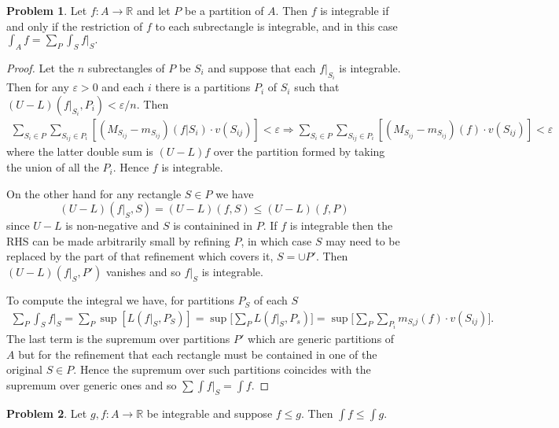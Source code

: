 \documentclass[20pt]{article}
\theoremstyle{plain}
\theoremstyle{definition}
\newtheorem*{problem}{Problem}
\newcommand{\reals}{\mathbb{R}}
\begin{document}
\begin{problem}{3.4}
  Let $f: A\to \reals$ and let $P$ be a partition of $A$. Then $f$ is integrable
  if and only if the restriction of $f$ to each subrectangle is integrable,
  and in this case $\int_A f = \sum_P \int_S f|_S.$
\end{problem}

\begin{proof}
  Let the $n$ subrectangles of $P$ be $S_i$ and suppose that each $f|_{S_i}$ is integrable.
  Then for any $\varepsilon > 0$ and each $i$ there is a partitions $P_i$ of $S_i$ such that
  $(U - L)(f|_{S_i}, P_i) <\varepsilon / n.$
  Then
  \begin{align*}
    \sum_{S_i \in P} \sum_{S_{ij} \in P_i} [ (M_{S_{ij}} - m_{S_{ij}})(f|S_i)\cdot v(S_{ij}) ] <
    \varepsilon \Longrightarrow
    \sum_{S_i \in P} \sum_{S_{ij} \in P_i} [ (M_{S_{ij}} - m_{S_{ij}})(f)\cdot v(S_{ij}) ] <
    \varepsilon
  \end{align*}
  where the latter double sum is $(U - L)f$ over the partition formed by taking the union of
  all the $P_i.$  Hence $f$ is integrable.

  On the other hand for any rectangle $S \in P$  we have
  $$(U-L)(f|_S, S) = (U-L)(f, S) \leq (U - L)(f, P)$$
  since $U-L$ is non-negative and $S$ is containined in $P$.
  If $f$ is integrable then the RHS can be made arbitrarily small by refining $P$,
  in which case $S$ may need to be replaced by the part of that refinement which
  covers it, $S = \cup P'$. Then $(U-L)(f|_S, P')$ vanishes and so $f|_S$
  is integrable.

  To compute the integral we have, for partitions $P_S$ of each $S$
  \begin{align*}
    \sum_P \int_{S} f|_S =
    \sum_P \sup [L(f|_S, P_S)] =
    \sup \bigg[\sum_P L(f|_S, P_s)\bigg] =
    \sup \bigg[\sum_P \sum_{P_i} m_{S_ij}(f)\cdot v(S_{ij}) \bigg].
  \end{align*}
  The last term is the supremum over partitions $P'$ which are generic partitions
  of $A$ but for the refinement that each rectangle must be contained in one of the
  original $S \in P.$
  Hence the supremum over such partitions coincides with the supremum over generic ones
  and so $\sum \int f|_S = \int f.$
\end{proof}


\begin{problem}{3.5}
  Let $g, f: A \to \reals$ be integrable and suppose $f \leq g$.
  Then $\int f \leq \int g.$
\end{problem}
\end{document}
